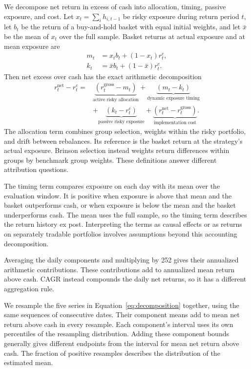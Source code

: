 \documentclass{article}
\begin{document}
We decompose net return in excess of cash into allocation, timing, passive exposure, and cost. Let $x_t=\sum_i h_{i,t-1}$ be risky exposure during return period $t$,
let $b_t$ be the return of a buy-and-hold basket with equal initial weights, and let
$\bar{x}$ be the mean of $x_t$ over the full sample. Basket returns at actual exposure and at mean exposure are
\begin{align}
  m_t &= x_t b_t + (1-x_t)r^c_t, \\
  k_t &= \bar{x} b_t + (1-\bar{x})r^c_t.
\end{align}
Then net excess over cash has the exact arithmetic decomposition
\begin{align}
  r^{\mathrm{net}}_t-r^c_t
  ={}& \underbrace{(r^{\mathrm{gross}}_t-m_t)}_{\text{active risky allocation}}
  + \underbrace{(m_t-k_t)}_{\text{dynamic exposure timing}} \nonumber\\
  &+ \underbrace{(k_t-r^c_t)}_{\text{passive risky exposure}}
  + \underbrace{(r^{\mathrm{net}}_t-r^{\mathrm{gross}}_t)}_{\text{implementation cost}}.
  \label{eq:decomposition}
\end{align}
The allocation term combines group selection, weights within the risky portfolio, and drift between rebalances. Its reference is the basket return at the strategy's actual exposure. Brinson selection instead weights return differences within groups by benchmark group weights. These definitions answer different attribution questions.

The timing term compares exposure on each day with its mean over the evaluation window. It is positive when exposure is above that mean and the basket outperforms cash, or when exposure is below the mean and the basket underperforms cash. The mean uses the full sample, so the timing term describes the return history ex post. Interpreting the terms as causal effects or as returns on separately tradable portfolios involves assumptions beyond this accounting decomposition.

Averaging the daily components and multiplying by 252 gives their annualized arithmetic contributions. These contributions add to annualized mean return above cash. CAGR instead compounds the daily net returns, so it has a different aggregation rule.

We resample the five series in Equation~\ref{eq:decomposition} together, using the same sequences of consecutive dates. Their component means add to mean net return above cash in every resample. Each component's interval uses its own percentiles of the resampling distribution. Adding these component bounds generally gives different endpoints from the interval for mean net return above cash. The fraction of positive resamples describes the distribution of the estimated mean.
\end{document}
